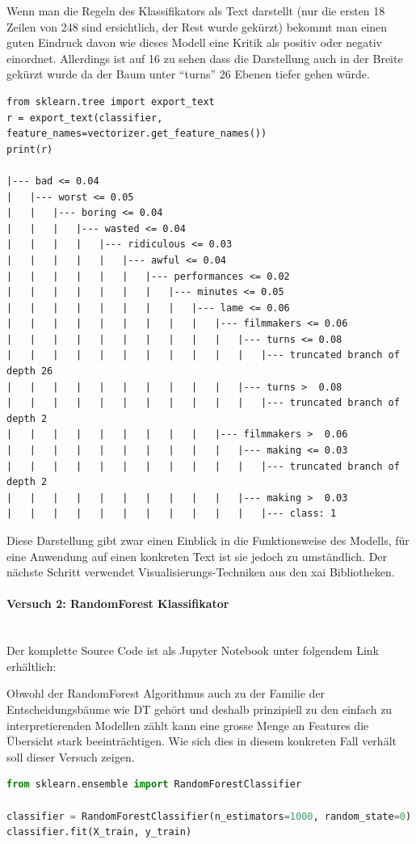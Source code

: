 \documentclass[
  12pt, %
  a4paper, %
  oneside, %
  openany, 
  numbers=noenddot, %
  BCOR=5mm, %
  parskip=half*, %
  thesis, %
]{bfhbook}
\newcommand{\parag}[1]{\paragraph*{#1}\mbox{}\\}
\begin{document}
Wenn man die Regeln des Klassifikators als Text darstellt (nur die ersten 18 Zeilen von 248 sind ersichtlich, der Rest wurde gekürzt) bekommt man einen guten Eindruck davon wie dieses Modell eine Kritik als positiv oder negativ einordnet. Allerdings ist auf 16 zu sehen dass die Darstellung auch in der Breite gekürzt wurde da der Baum unter ``turns'' 26 Ebenen tiefer gehen würde.
\begin{lstlisting}
from sklearn.tree import export_text
r = export_text(classifier, feature_names=vectorizer.get_feature_names())
print(r)

|--- bad <= 0.04
|   |--- worst <= 0.05
|   |   |--- boring <= 0.04
|   |   |   |--- wasted <= 0.04
|   |   |   |   |--- ridiculous <= 0.03
|   |   |   |   |   |--- awful <= 0.04
|   |   |   |   |   |   |--- performances <= 0.02
|   |   |   |   |   |   |   |--- minutes <= 0.05
|   |   |   |   |   |   |   |   |--- lame <= 0.06
|   |   |   |   |   |   |   |   |   |--- filmmakers <= 0.06
|   |   |   |   |   |   |   |   |   |   |--- turns <= 0.08
|   |   |   |   |   |   |   |   |   |   |   |--- truncated branch of depth 26
|   |   |   |   |   |   |   |   |   |   |--- turns >  0.08
|   |   |   |   |   |   |   |   |   |   |   |--- truncated branch of depth 2
|   |   |   |   |   |   |   |   |   |--- filmmakers >  0.06
|   |   |   |   |   |   |   |   |   |   |--- making <= 0.03
|   |   |   |   |   |   |   |   |   |   |   |--- truncated branch of depth 2
|   |   |   |   |   |   |   |   |   |   |--- making >  0.03
|   |   |   |   |   |   |   |   |   |   |   |--- class: 1
\end{lstlisting}
Diese Darstellung gibt zwar einen Einblick in die Funktionsweise des Modells, für eine Anwendung auf einen konkreten Text ist sie jedoch zu umständlich. Der nächste Schritt verwendet Visualisierungs-Techniken aus den \Gls{xai} Bibliotheken.

\parag{Versuch 2: RandomForest Klassifikator}
Der komplette Source Code ist als Jupyter Notebook unter folgendem Link erhältlich: \parencite{textClassEli5}

Obwohl der RandomForest Algorithmus auch zu der Familie der Entscheidungsbäume wie \Gls{DT} gehört und deshalb prinzipiell zu den einfach zu interpretierenden Modellen zählt kann eine grosse Menge an Features die Übersicht stark beeinträchtigen. Wie sich dies in diesem konkreten Fall verhält soll dieser Versuch zeigen.
\begin{lstlisting}[language=Python]
from sklearn.ensemble import RandomForestClassifier

classifier = RandomForestClassifier(n_estimators=1000, random_state=0)
classifier.fit(X_train, y_train)
\end{lstlisting}
\end{document}
